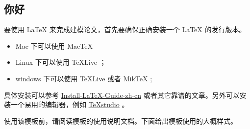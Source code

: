 \documentclass[withoutpreface,bwprint]{cumcmthesis}
\begin{document}
\newpage
\subsection{你好}
要使用 \LaTeX{} 来完成建模论文，首先要确保正确安装一个 \LaTeX{} 的发行版本。

\begin{itemize}
    \item Mac 下可以使用 Mac\TeX{}
    \item Linux 下可以使用 \TeX{}Live ；
    \item windows 下可以使用 \TeX{}Live 或者 Mik\TeX{} ;
\end{itemize}

具体安装可以参考 \href{https://github.com/OsbertWang/install-latex-guide-zh-cn/releases/}{Install-LaTeX-Guide-zh-cn} 或者其它靠谱的文章。另外可以安装一个易用的编辑器，例如 \href{https://mirrors.tuna.tsinghua.edu.cn/github-release/texstudio-org/texstudio/LatestRelease/}{\TeX{}studio} 。

使用该模板前，请阅读模板的使用说明文档。下面给出模板使用的大概样式。
\end{document}
